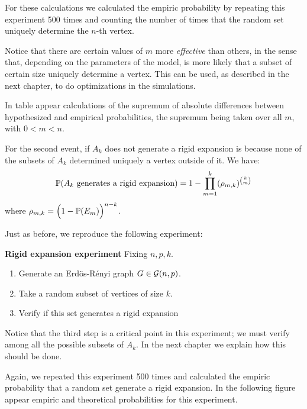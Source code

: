 For these calculations we calculated the empiric probability by repeating this experiment 500 times and counting the number of times that the random set uniquely determine the $n$-th vertex.

Notice that there are certain values of $m$ more \textit{effective} than others, in the sense that, depending on the parameters of the model, is more likely that a subset of certain size uniquely determine a vertex. This can be used, as described in the next chapter, to do optimizations in the simulations.
 
In table \cite{tableExp1} appear calculations of the supremum of absolute differences between hypothesized and empirical probabilities, the supremum being taken over all $m$, with $0<m<n$.

\vspace{0.3cm}\label{tableExp1}

\vspace{-0.3cm}
 
For the second event, if $A_k$ does not generate a rigid expansion is because none of the subsets of $A_{k}$ determined uniquely a vertex outside of it. We have:
$$\P(A_k \text{ generates a rigid expansion}) = 1 -  \prod_{m=1}^{k} (\rho_{m,k})^{\binom{k}{m}}$$
where $\rho_{m,k} = \Big(1 -  \P(E_m)\Big)^{n-k}$.

Just as before, we reproduce the following experiment:
 
\begin{cajita}
\textbf{Rigid expansion experiment} \hfill \break
Fixing $n,p,k$.
\begin{enumerate}
\item Generate an Erdös-Rényi graph $G\in \G(n,p)$.
\item Take a random subset of vertices of size $k$.
\item Verify if this set generates a rigid expansion
\end{enumerate}
\end{cajita}

Notice that the third step is a critical point in this experiment; we must verify among all the possible subsets of $A_{k}$. In the next chapter we explain how this should be done.

Again, we repeated this experiment 500 times and calculated the empiric probability that a random set generate a rigid expansion. In the following figure appear empiric and theoretical probabilities for this experiment.

